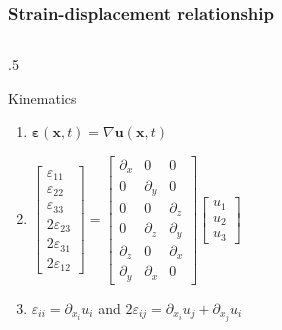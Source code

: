 \documentclass[aspectratio=169]{beamer}
\begin{document}
{\begin{frame}
  \frametitle{Strain-displacement relationship}
  \vspace{-.4cm}
  \begin{columns}[T]
    \hspace{1.5cm}\begin{column}{.5\textwidth}
      \begin{block}{Kinematics}
        \begin{enumerate}
          \item[a)] $\boldsymbol\varepsilon(\mathbf x,t) =\nabla\mathbf u(\mathbf x,t)$
                \vspace{0.2cm}
          \item[b)] $\begin{bmatrix}\varepsilon_{11}\\ \varepsilon_{22}\\ \varepsilon_{33}\\ 2\varepsilon_{23}\\ 2\varepsilon_{31}\\ 2\varepsilon_{12}\end{bmatrix}=\begin{bmatrix} \partial_x & 0 & 0 \\ 0 & \partial_y & 0 \\ 0 & 0 & \partial_z \\ 0 & \partial_z & \partial_y \\ \partial_z & 0 & \partial_x  \\ \partial_y & \partial_x & 0 \end{bmatrix}\begin{bmatrix}u_{1}\\ u_{2}\\ u_{3}\end{bmatrix}$
                \vspace{0.2cm}
          \item[c)] $\varepsilon_{ii}=\partial_{x_{i}}u_i$ and $2\varepsilon_{ij}=\partial_{x_{i}}u_j+\partial_{x_{j}}u_i$
        \end{enumerate}
      \end{block}
    \end{column}
  \end{columns}
\end{frame}



}
\end{document}
